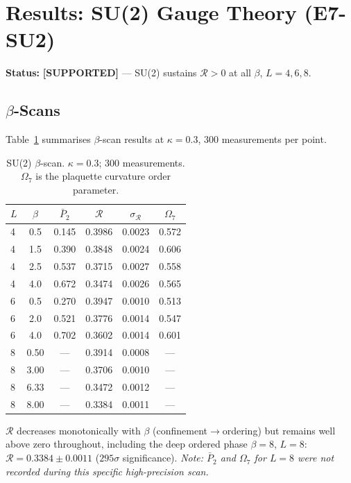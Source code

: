 \documentclass[12pt,a4paper]{article}
\newcommand{\R}{\mathcal{R}}           %
\newcommand{\supported}{\textcolor{cyan!50!blue}{\textbf{[SUPPORTED]}}}
\theoremstyle{plain}
\theoremstyle{definition}
\theoremstyle{remark}
\begin{document}
\section{Results: SU(2) Gauge Theory (E7-SU2)}
\label{sec:su2}

\begin{statusbox}
\textbf{Status:} \supported{} --- SU(2) sustains $\R>0$ at all $\beta$, $L=4,6,8$.
\end{statusbox}

\subsection{$\beta$-Scans}

Table~\ref{tab:su2_bscan} summarises $\beta$-scan results at $\kappa=0.3$,
300 measurements per point.

\begin{table}[ht]
\centering
\caption{SU(2) $\beta$-scan. $\kappa=0.3$; 300 measurements. $\Omega_7$ is the
plaquette curvature order parameter.}
\label{tab:su2_bscan}
\begin{tabular}{lccccc}
\toprule
$L$ & $\beta$ & $\bar{P}_2$ & $\R$ & $\sigma_\R$ & $\Omega_7$ \\
\midrule
4 & 0.5  & 0.145 & 0.3986 & 0.0023 & 0.572 \\
4 & 1.5  & 0.390 & 0.3848 & 0.0024 & 0.606 \\
4 & 2.5  & 0.537 & 0.3715 & 0.0027 & 0.558 \\
4 & 4.0  & 0.672 & 0.3474 & 0.0026 & 0.565 \\
\midrule
6 & 0.5  & 0.270 & 0.3947 & 0.0010 & 0.513 \\
6 & 2.0  & 0.521 & 0.3776 & 0.0014 & 0.547 \\
6 & 4.0  & 0.702 & 0.3602 & 0.0014 & 0.601 \\
\midrule
8 & 0.50 & ---   & 0.3914 & 0.0008 & --- \\
8 & 3.00 & ---   & 0.3706 & 0.0010 & --- \\
8 & 6.33 & ---   & 0.3472 & 0.0012 & --- \\
8 & 8.00 & ---   & 0.3384 & 0.0011 & --- \\
\bottomrule
\end{tabular}
\end{table}

$\R$ decreases monotonically with $\beta$ (confinement$\to$ordering) but remains
well above zero throughout, including the deep ordered phase $\beta=8$, $L=8$:
$\R=0.3384\pm0.0011$ ($295\sigma$ significance). \textit{Note: $\bar{P}_2$ and $\Omega_7$ for $L=8$ were not recorded during this specific high-precision scan.}
\end{document}
